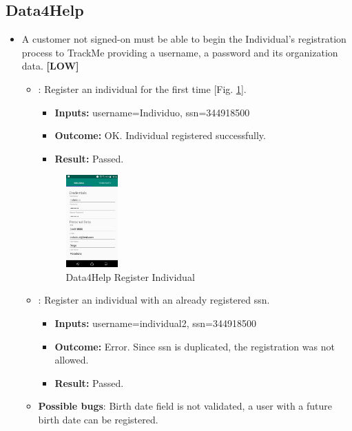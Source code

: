 \documentclass[a4paper, hidelinks, 12pt]{report}
\newcommand\requirement[1]{\item[{[REQ-#1]}] }
\newcommand\test[1]{\item[{[TEST-#1]}] }
\begin{document}
	\subsection{Data4Help}
	\begin{itemize}
		\requirement{1} A customer not signed-on must be able to begin the Individual’s registration process to TrackMe providing a username, a password and its organization data.  \textbf{[LOW]}
		
	\begin{itemize}
		\test{1}: Register an individual for the first time [Fig. \ref{fig:register_individual}].
			\begin{itemize}
			\item \textbf{Inputs: } username=Individuo, ssn=344918500			
			\item \textbf{Outcome: } OK. Individual registered successfully. 
			\item \textbf{Result: } Passed. 
			\end{itemize}
			
		\begin{figure}[H]
					\centering
				\includegraphics[width=0.2\textwidth]{images/register_individual.jpeg}
					\caption[Data4Help Register Individual]{Data4Help Register Individual}
				\label{fig:register_individual}
			\end{figure}
			
		\test{2}: Register an individual with an already registered ssn.
			\begin{itemize}
			\item \textbf{Inputs: } username=individual2, ssn=344918500
			\item \textbf{Outcome: } Error. Since ssn is duplicated, the registration was not allowed.
			\item \textbf{Result: } Passed. 
			 \end{itemize}	
			 
		\item \textbf{Possible bugs}: Birth date field is not validated, a user with a future birth date can be registered.
	\end{itemize}
	

\end{itemize}
\end{document}
